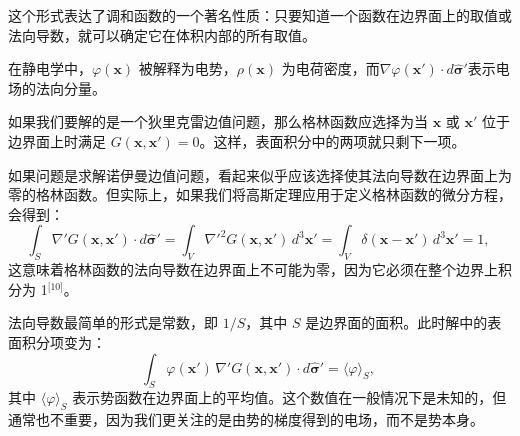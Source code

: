 这个形式表达了调和函数的一个著名性质：只要知道一个函数在边界面上的取值或法向导数，就可以确定它在体积内部的所有取值。

在静电学中，$\varphi(\mathbf{x})$ 被解释为电势，$\rho(\mathbf{x})$ 为电荷密度，而$\nabla \varphi(\mathbf{x}') \cdot d\hat{\boldsymbol{\sigma}}'$表示电场的法向分量。

如果我们要解的是一个狄里克雷边值问题，那么格林函数应选择为当 $\mathbf{x}$ 或 $\mathbf{x}'$ 位于边界面上时满足 $G(\mathbf{x}, \mathbf{x}') = 0$。这样，表面积分中的两项就只剩下一项。

如果问题是求解诺伊曼边值问题，看起来似乎应该选择使其法向导数在边界面上为零的格林函数。但实际上，如果我们将高斯定理应用于定义格林函数的微分方程，会得到：
$$
\int_S \nabla' G(\mathbf{x}, \mathbf{x}') \cdot d\hat{\boldsymbol{\sigma}}' = \int_V \nabla'^2 G(\mathbf{x}, \mathbf{x}')\,d^3\mathbf{x}' = \int_V \delta(\mathbf{x} - \mathbf{x}')\,d^3\mathbf{x}' = 1,~
$$
这意味着格林函数的法向导数在边界面上不可能为零，因为它必须在整个边界上积分为 1\(^\text{[10]}\)。

法向导数最简单的形式是常数，即 $1/S$，其中 $S$ 是边界面的面积。此时解中的表面积分项变为：
$$
\int_S \varphi(\mathbf{x}')\,\nabla' G(\mathbf{x}, \mathbf{x}') \cdot d\hat{\boldsymbol{\sigma}}' = \langle \varphi \rangle_S,~
$$
其中 $\langle \varphi \rangle_S$ 表示势函数在边界面上的平均值。这个数值在一般情况下是未知的，但通常也不重要，因为我们更关注的是由势的梯度得到的电场，而不是势本身。
